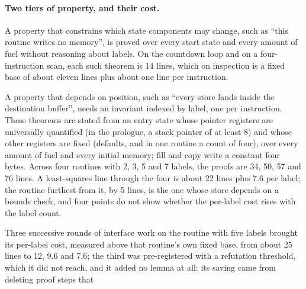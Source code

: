 \documentclass[runningheads]{llncs}
\newcommand{\src}[1]{}  %
\begin{document}
\paragraph{Two tiers of property, and their cost.}
A property that constrains which state components may change, such as ``this routine writes no
memory'', is proved over every start state and every amount of fuel without reasoning about labels. On
the countdown loop and on a four-instruction scan, each such theorem is 14 lines, which on inspection
is a fixed base of about eleven lines plus about one line per instruction.
\src{docs/P2-PROOF-INTERFACE.md, problem 3 section 1; the equal counts are a coincidence of line
wrapping; counted by scripts/proof\_lines.py; docs/CLAIMS.tsv[proof\_lines\_countdown, proof\_lines\_scan]}
A property that depends on position, such as ``every store lands inside the destination buffer'', needs
an invariant indexed by label, one per instruction. These theorems are stated from an entry state whose pointer registers
are universally quantified (in the prologue, a stack pointer of at least 8) and whose other registers are fixed (defaults, and in one routine a count of
four), over every amount of fuel and every initial memory; fill and copy write a constant four
bytes. Across four routines with 2, 3, 5 and 7 labels, the proofs are 34, 50, 57
and 76 lines. A least-squares line through the four is about 22 lines plus 7.6 per label; the routine furthest from it, by 5 lines, is the one whose store depends on a
bounds check, and four points do not show whether the per-label cost rises with the label count.
\src{Tests/Program.lean entry, cpyEntry, frameEntry, guardEntry (rdx := 4); fill and memcpy load rcx with 4; fill\_safe and memcpy\_safe over
(pointers, m0, n) with Region d0 4 (D250);
scripts/label\_fit.py (a label is an entry of the invariant's table, cross-checked against the program's
instructions; lines by scripts/proof\_lines.py); docs/CLAIMS.tsv[fit\_labels\_prologue, fit\_labels\_guarded,
fit\_labels\_fill, fit\_labels\_memcpy, proof\_lines\_prologue, proof\_lines\_guarded, proof\_lines\_fill,
proof\_lines\_memcpy, fit\_intercept, fit\_slope, fit\_max\_residual]; docs/DECISIONS.md D234: the
guarded routine was recorded as 4 labels, and the earlier fit of 19 plus 7.5 to 8.1 per label rested on it}
Three successive rounds of interface work on the routine with five labels brought its per-label cost,
measured above that routine's own fixed base, from about 25 lines to 12, 9.6 and 7.6; the third was pre-registered with a refutation threshold, which
it did not reach, and it added no lemma at all: its saving came from deleting proof steps that
\end{document}

